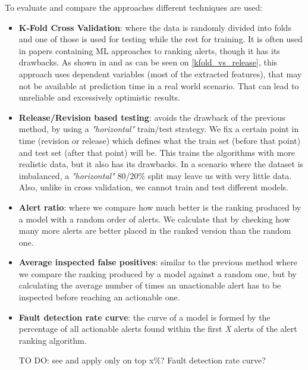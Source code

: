 \documentclass{article}
\begin{document}
To evaluate and compare the approaches different techniques are used: 
\begin{itemize}
    \item \textbf{K-Fold Cross Validation}: where the data is randomly divided into folds and one of those is used for testing while the rest for training. It is often used in papers containing ML approaches to ranking alerts, though it has its drawbacks. As shown in \cite{performance_method_bug} and as can be seen on \cref{kfold_vs_release}, this approach uses dependent variables (most of the extracted features), that may not be available at prediction time in a real world scenario. That can lead to unreliable and excessively optimistic results.
    \item \textbf{Release/Revision based testing}: avoids the drawback of the previous method, by using a \textit{"horizontal"} train/test strategy. We fix a certain point in time (revision or release) which defines what the train set (before that point) and test set (after that point) will be. This trains the algorithms with more realistic data, but it also has its drawbacks. In a scenario where the dataset is imbalanced, a \textit{"horizontal"} 80/20\% split may leave us with very little data. Also, unlike in cross validation, we cannot train and test different models.
    \item \textbf{Alert ratio}: where we compare how much better is the ranking produced by a model with a random order of alerts. We calculate that by checking how many more alerts are better placed in the ranked version than the random one.
    \item \textbf{Average inspected false positives}: similar to the previous method where we compare the ranking produced by a model against a random one, but by calculating the average  number of times an unactionable alert has to be inspected before reaching an actionable one.
    \item \textbf{Fault detection rate curve}: the curve of a model is formed by the percentage of all actionable alerts found within the first \textit{X} alerts of the alert
    ranking algorithm.
    
    TO DO: see \cite{compare_framework} and apply only on top x\%? Fault detection rate curve?
    
\end{itemize}
\end{document}
